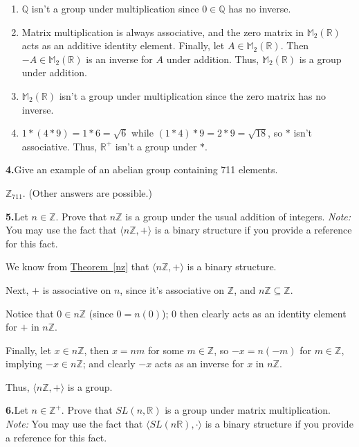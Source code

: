 \documentclass[10pt,]{book}
\theoremstyle{plain}
\theoremstyle{definition}
\theoremstyle{definition}
\theoremstyle{definition}
\theoremstyle{definition}
\numberwithin{equation}{section}
\def\Z{\mathbb{Z}}
\def\R{\mathbb{R}}
\def\Q{\mathbb{Q}}
\def\M{\mathbb{M}}
\begin{document}
%
\par\smallskip
\leavevmode%
\begin{enumerate}[label=(\alph*)]
\item\hypertarget{li-109}{}\(\Q\) isn't a group under multiplication since \(0\in \Q\) has no inverse.%
\item\hypertarget{li-110}{}Matrix multiplication is always associative, and the zero matrix in \(\M_2(\R)\) acts as an additive identity element.            Finally, let \(A\in \M_2(\R)\).  Then \(-A\in \M_2(\R)\) is an inverse for \(A\) under addition. Thus, \(\M_2(\R)\) is a group under addition.%
\item\hypertarget{li-111}{}\(\M_2(\R)\) isn't a group under multiplication since the zero matrix has no inverse.%
\item\hypertarget{li-112}{}\(1*(4*9)=1*6=\sqrt{6}\) while \((1*4)*9=2*9=\sqrt{18}\), so \(*\) isn't associative.  Thus, \(\R^+\) isn't a group under \(*\).%
\end{enumerate}
\par\smallskip
\noindent\textbf{4.}\quad{}Give an example of an abelian group containing 711 elements.%
\par\smallskip
\(\Z_{711}\). (Other answers are possible.)%
\par\smallskip
\noindent\textbf{5.}\quad{}Let \(n\in \Z\). Prove that \(n\Z\) is a group under the usual addition of integers. \emph{Note:} You may use the fact that \(\langle n\Z,+\rangle\) is a binary structure if you provide a reference for this fact.%
\par\smallskip
We know from \hyperref[nz]{Theorem~\ref{nz}} that \(\langle n\Z,+\rangle\) is a binary structure.%
\par
Next, \(+\) is associative on \(n\), since it's associative on \(\Z\), and \(n\Z \subseteq \Z\).%
\par
Notice that \(0\in n\Z\) (since \(0=n(0)\)); 0 then clearly acts as an identity element for \(+\) in \(n\Z\).%
\par
Finally, let \(x\in n\Z\), then \(x=nm\) for some \(m\in \Z\), so \(-x=n(-m)\) for \(m\in \Z\), implying \(-x\in n\Z\); and clearly \(-x\) acts as an inverse for \(x\) in \(n\Z\).%
\par
Thus, \(\langle n\Z, +\rangle\) is a group.%
\par\smallskip
\noindent\textbf{6.}\quad{}Let \(n\in \Z^+\). Prove that \(SL(n,\R)\) is a group under matrix multiplication. \emph{Note:} You may use the fact that \(\langle SL(n\R),\cdot\rangle\) is a binary structure if you provide a reference for this fact.%
\end{document}

